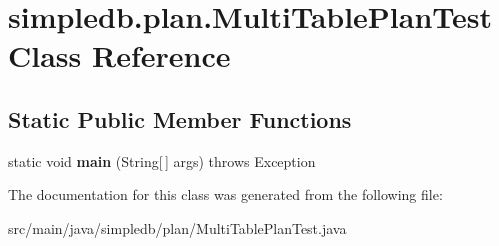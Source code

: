 \hypertarget{classsimpledb_1_1plan_1_1MultiTablePlanTest}{}\section{simpledb.\+plan.\+Multi\+Table\+Plan\+Test Class Reference}
\label{classsimpledb_1_1plan_1_1MultiTablePlanTest}
\subsection*{Static Public Member Functions}
\begin{DoxyCompactItemize}
\item 
\mbox{\label{classsimpledb_1_1plan_1_1MultiTablePlanTest_a9e936592f85269ddca8449f82179646d}} 
static void {\bfseries main} (String\mbox{[}$\,$\mbox{]} args)  throws Exception 
\end{DoxyCompactItemize}


The documentation for this class was generated from the following file\+:\begin{DoxyCompactItemize}
\item 
src/main/java/simpledb/plan/Multi\+Table\+Plan\+Test.\+java\end{DoxyCompactItemize}
